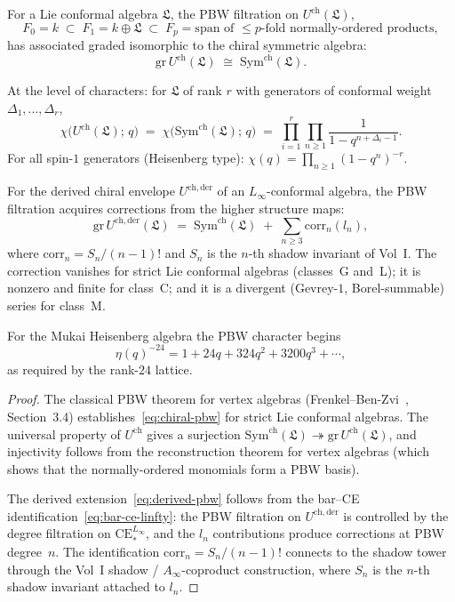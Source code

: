 \begin{theorem}
\label{thm:chiral-pbw}
For a Lie conformal algebra $\mathfrak{L}$, the PBW filtration on $U^{\mathrm{ch}}(\mathfrak{L})$,
\[
 F_0 = k \;\subset\; F_1 = k \oplus \mathfrak{L} \;\subset\; F_p = \text{span of $\leq p$-fold normally-ordered products},
\]
has associated graded isomorphic to the chiral symmetric algebra:
\begin{equation}\label{eq:chiral-pbw}
 \mathrm{gr}\, U^{\mathrm{ch}}(\mathfrak{L}) \;\cong\; \mathrm{Sym}^{\mathrm{ch}}(\mathfrak{L}).
\end{equation}

At the level of characters: for $\mathfrak{L}$ of rank $r$ with generators of conformal weight $\Delta_1, \ldots, \Delta_r$,
\[
 \chi\bigl(U^{\mathrm{ch}}(\mathfrak{L});\, q\bigr)
 \;=\; \chi\bigl(\mathrm{Sym}^{\mathrm{ch}}(\mathfrak{L});\, q\bigr)
 \;=\; \prod_{i=1}^{r} \prod_{n \geq 1} \frac{1}{1 - q^{n + \Delta_i - 1}}.
\]
For all spin-$1$ generators (Heisenberg type): $\chi(q) = \prod_{n \geq 1} (1-q^n)^{-r}$.

For the derived chiral envelope $U^{\mathrm{ch,der}}$ of an $L_\infty$-conformal algebra, the PBW filtration acquires corrections from the higher structure maps:
\begin{equation}\label{eq:derived-pbw}
 \mathrm{gr}\, U^{\mathrm{ch,der}}(\mathfrak{L})
 \;=\; \mathrm{Sym}^{\mathrm{ch}}(\mathfrak{L})
 \;+\; \sum_{n \geq 3} \mathrm{corr}_n(l_n),
\end{equation}
where $\mathrm{corr}_n = S_n / (n-1)!$ and $S_n$ is the $n$-th shadow invariant of Vol~I. The correction vanishes for strict Lie conformal algebras (classes~G and~L); it is nonzero and finite for class~C; and it is a divergent (Gevrey-$1$, Borel-summable) series for class~M.

For the Mukai Heisenberg algebra the PBW character begins
\[
\eta(q)^{-24}=1+24q+324q^2+3200q^3+\cdots,
\]
as required by the rank-$24$ lattice.
\end{theorem}

\begin{proof}
The classical PBW theorem for vertex algebras (Frenkel--Ben-Zvi~\cite{FrenkelBenZvi}, Section~3.4) establishes~\eqref{eq:chiral-pbw} for strict Lie conformal algebras. The universal property of $U^{\mathrm{ch}}$ gives a surjection $\mathrm{Sym}^{\mathrm{ch}}(\mathfrak{L}) \twoheadrightarrow \mathrm{gr}\, U^{\mathrm{ch}}(\mathfrak{L})$, and injectivity follows from the reconstruction theorem for vertex algebras (which shows that the normally-ordered monomials form a PBW basis).

The derived extension~\eqref{eq:derived-pbw} follows from the bar--CE identification~\eqref{eq:bar-ce-linfty}: the PBW filtration on $U^{\mathrm{ch,der}}$ is controlled by the degree filtration on $\mathrm{CE}_*^{L_\infty}$, and the $l_n$ contributions produce corrections at PBW degree~$n$. The identification $\mathrm{corr}_n = S_n/(n-1)!$ connects to the shadow tower through the Vol~I shadow / $A_\infty$-coproduct construction, where $S_n$ is the $n$-th shadow invariant attached to $l_n$.
\end{proof}


